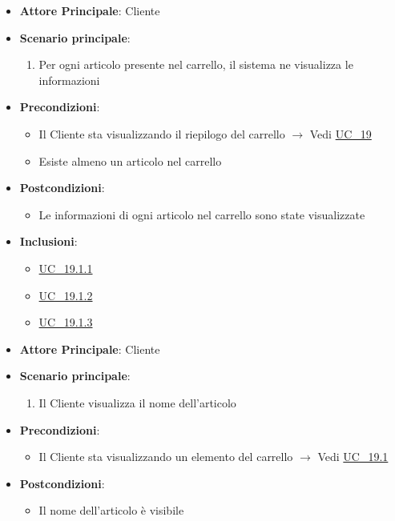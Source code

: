 \label{uc_19.1}

\begin{itemize}
    \item \textbf{Attore Principale}: Cliente
	\item \textbf{Scenario principale}: 
	\begin{enumerate}
		\item Per ogni articolo presente nel carrello, il sistema ne visualizza le informazioni
	\end{enumerate}
	\item \textbf{Precondizioni}: 
	\begin{itemize}
		\item Il Cliente sta visualizzando il riepilogo del carrello $\rightarrow$ Vedi \hyperref[uc_19]{UC\_19}
		\item Esiste almeno un articolo nel carrello
	\end{itemize}
	\item \textbf{Postcondizioni}:
	\begin{itemize}
		\item Le informazioni di ogni articolo nel carrello sono state visualizzate
	\end{itemize}
	\item \textbf{Inclusioni}:
	\begin{itemize}
		\item \hyperref[uc_19.1.1]{UC\_19.1.1}
		\item \hyperref[uc_19.1.2]{UC\_19.1.2}
		\item \hyperref[uc_19.1.3]{UC\_19.1.3}
	\end{itemize}
\end{itemize}

\label{uc_19.1.1}
\begin{itemize}
    \item \textbf{Attore Principale}: Cliente
	\item \textbf{Scenario principale}: 
	\begin{enumerate}
		\item Il Cliente visualizza il nome dell'articolo
	\end{enumerate}
	\item \textbf{Precondizioni}: 
	\begin{itemize}
		\item Il Cliente sta visualizzando un elemento del carrello $\rightarrow$ Vedi \hyperref[uc_19.1]{UC\_19.1}
	\end{itemize}
	\item \textbf{Postcondizioni}:
	\begin{itemize}
		\item Il nome dell'articolo è visibile
	\end{itemize} 
\end{itemize}

